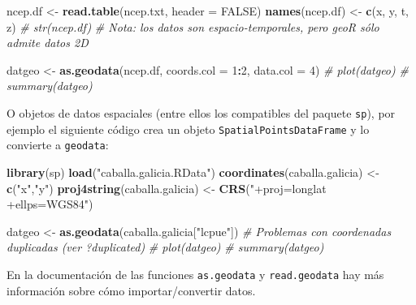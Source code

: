 \documentclass[
]{book}
\newenvironment{Shaded}{\begin{snugshade}}{\end{snugshade}}
\newcommand{\AttributeTok}[1]{\textcolor[rgb]{0.13,0.29,0.53}{#1}}
\newcommand{\CommentTok}[1]{\textcolor[rgb]{0.56,0.35,0.01}{\textit{#1}}}
\newcommand{\ConstantTok}[1]{\textcolor[rgb]{0.56,0.35,0.01}{#1}}
\newcommand{\DecValTok}[1]{\textcolor[rgb]{0.00,0.00,0.81}{#1}}
\newcommand{\FunctionTok}[1]{\textcolor[rgb]{0.13,0.29,0.53}{\textbf{#1}}}
\newcommand{\NormalTok}[1]{#1}
\newcommand{\OtherTok}[1]{\textcolor[rgb]{0.56,0.35,0.01}{#1}}
\newcommand{\SpecialCharTok}[1]{\textcolor[rgb]{0.81,0.36,0.00}{\textbf{#1}}}
\newcommand{\StringTok}[1]{\textcolor[rgb]{0.31,0.60,0.02}{#1}}
\theoremstyle{break}
\theoremstyle{definition}
\theoremstyle{definition}
\theoremstyle{definition}
\theoremstyle{definition}
\theoremstyle{remark}
\begin{document}
\begin{Shaded}
\begin{Highlighting}[]
\NormalTok{ncep.df }\OtherTok{\textless{}{-}} \FunctionTok{read.table}\NormalTok{(}\StringTok{\textquotesingle{}ncep.txt\textquotesingle{}}\NormalTok{, }\AttributeTok{header =} \ConstantTok{FALSE}\NormalTok{)}
\FunctionTok{names}\NormalTok{(ncep.df) }\OtherTok{\textless{}{-}} \FunctionTok{c}\NormalTok{(}\StringTok{\textquotesingle{}x\textquotesingle{}}\NormalTok{, }\StringTok{\textquotesingle{}y\textquotesingle{}}\NormalTok{, }\StringTok{\textquotesingle{}t\textquotesingle{}}\NormalTok{, }\StringTok{\textquotesingle{}z\textquotesingle{}}\NormalTok{)}
\CommentTok{\# str(ncep.df)}
\CommentTok{\# Nota: los datos son espacio{-}temporales, pero geoR sólo admite datos 2D}

\NormalTok{datgeo }\OtherTok{\textless{}{-}} \FunctionTok{as.geodata}\NormalTok{(ncep.df, }\AttributeTok{coords.col =} \DecValTok{1}\SpecialCharTok{:}\DecValTok{2}\NormalTok{, }\AttributeTok{data.col =} \DecValTok{4}\NormalTok{)}
\CommentTok{\# plot(datgeo)}
\CommentTok{\# summary(datgeo)}
\end{Highlighting}
\end{Shaded}

O objetos de datos espaciales (entre ellos los compatibles del paquete \texttt{sp}),
por ejemplo el siguiente código crea un objeto \texttt{SpatialPointsDataFrame}
y lo convierte a \texttt{geodata}:

\begin{Shaded}
\begin{Highlighting}[]
\FunctionTok{library}\NormalTok{(sp)}
\FunctionTok{load}\NormalTok{(}\StringTok{"caballa.galicia.RData"}\NormalTok{)}
\FunctionTok{coordinates}\NormalTok{(caballa.galicia) }\OtherTok{\textless{}{-}} \FunctionTok{c}\NormalTok{(}\StringTok{"x"}\NormalTok{,}\StringTok{"y"}\NormalTok{)}
\FunctionTok{proj4string}\NormalTok{(caballa.galicia) }\OtherTok{\textless{}{-}} \FunctionTok{CRS}\NormalTok{(}\StringTok{"+proj=longlat +ellps=WGS84"}\NormalTok{)}

\NormalTok{datgeo }\OtherTok{\textless{}{-}} \FunctionTok{as.geodata}\NormalTok{(caballa.galicia[}\StringTok{"lcpue"}\NormalTok{])}
\CommentTok{\# Problemas con coordenadas duplicadas  (ver ?duplicated)}
\CommentTok{\# plot(datgeo)}
\CommentTok{\# summary(datgeo)     }
\end{Highlighting}
\end{Shaded}

En la documentación de las funciones \texttt{as.geodata} y \texttt{read.geodata}
hay más información sobre cómo importar/convertir datos.
\end{document}
